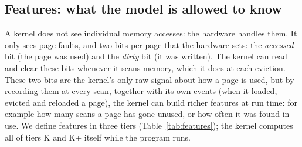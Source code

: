 \documentclass[10.5pt,a4paper]{article}
\begin{document}
\subsection{Features: what the model is allowed to know}

A kernel does not see individual memory accesses: the hardware handles them.
It only sees page faults, and two bits per page that the hardware sets: the
\emph{accessed} bit (the page was used) and the \emph{dirty} bit (it was
written). The kernel can read and clear these bits whenever it scans memory,
which it does at each eviction. These two bits are the kernel's only raw
signal about how a page is used, but by recording them at every scan, together
with its own events (when it loaded, evicted and reloaded a page), the kernel
can build richer features at run time: for example how many scans a page has
gone unused, or how often it was found in use. We define features in three
tiers (Table~\ref{tab:features}); the kernel computes all of tiers K and K+
itself while the program runs.
\end{document}

